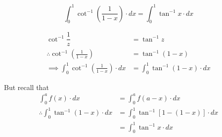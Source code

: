 \documentclass[14pt,fleqn]{extarticle}
\begin{document}
\[\int_0^1\cot^{-1}\left(\dfrac{1}{1-x} \right)\cdot dx = \int_0^1\tan^{-1} x\cdot dx \]
\newcard 

\begin{align}
	\cot^{-1} \dfrac{1}{z} &= \tan^{-1} z \\
	\therefore \cot^{-1} \left(\frac{1}{1-x} \right) &= \tan^{-1} \left(1-x \right) \\
	\implies \int_0^1 \cot^{-1} \left(\frac{1}{1-x} \right)\cdot dx &= \int_0^1 \tan^{-1} \left(1-x \right)\cdot dx 
\end{align}
	
But recall that 
\begin{align} 
	\int_0^a f(x)\cdot dx &= \int_0^a f(a-x)\cdot dx  \\
	\therefore\int_0^1 \tan^{-1} \left(1-x \right)\cdot dx &= \int_0^1\tan^{-1} \left[1-\left(1-x \right) \right]\cdot dx \\
	&=\int_0^1\tan^{-1} x\cdot dx  
\end{align}
\end{document}
